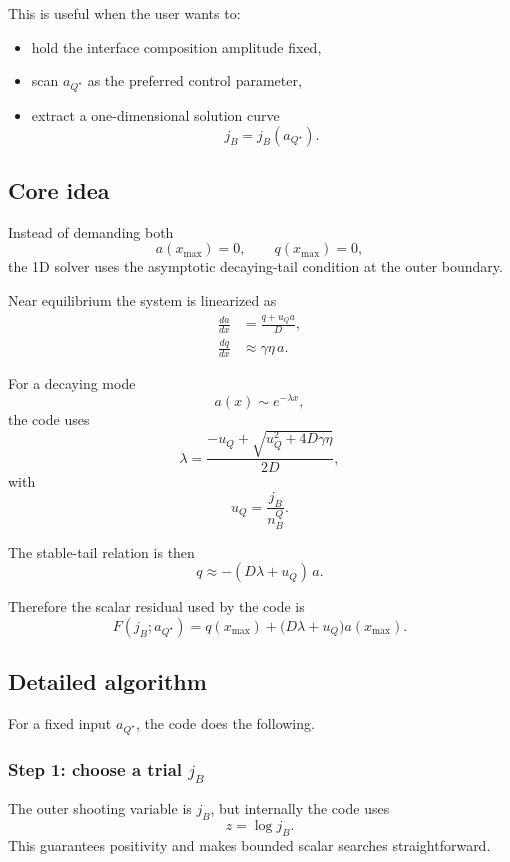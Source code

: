 \documentclass[11pt]{article}
\begin{document}
This is useful when the user wants to:
\begin{itemize}[leftmargin=1.5em]
\item hold the interface composition amplitude fixed,
\item scan $a_{Q^\star}$ as the preferred control parameter,
\item extract a one-dimensional solution curve
      \[
      j_B = j_B(a_{Q^\star}).
      \]
\end{itemize}

\subsection{Core idea}
Instead of demanding both
\[
a(x_{\max}) = 0, \qquad q(x_{\max}) = 0,
\]
the 1D solver uses the asymptotic decaying-tail condition at the outer
boundary.

Near equilibrium the system is linearized as
\begin{align}
\frac{da}{dx} &= \frac{q + u_Q a}{D}, \\
\frac{dq}{dx} &\approx \gamma \eta\, a.
\end{align}

For a decaying mode
\[
a(x) \sim e^{-\lambda x},
\]
the code uses
\begin{equation}
\lambda =
\frac{-u_Q + \sqrt{u_Q^2 + 4 D \gamma \eta}}{2 D},
\end{equation}
with
\[
u_Q = \frac{j_B}{n_B^Q}.
\]

The stable-tail relation is then
\begin{equation}
q \approx - (D \lambda + u_Q)\, a.
\end{equation}

Therefore the scalar residual used by the code is
\begin{equation}
F(j_B; a_{Q^\star}) =
q(x_{\max}) + \bigl(D \lambda + u_Q\bigr) a(x_{\max}).
\end{equation}

\subsection{Detailed algorithm}
For a fixed input $a_{Q^\star}$, the code does the following.

\subsubsection*{Step 1: choose a trial $j_B$}
The outer shooting variable is $j_B$, but internally the code uses
\[
z = \log j_B.
\]
This guarantees positivity and makes bounded scalar searches straightforward.
\end{document}
